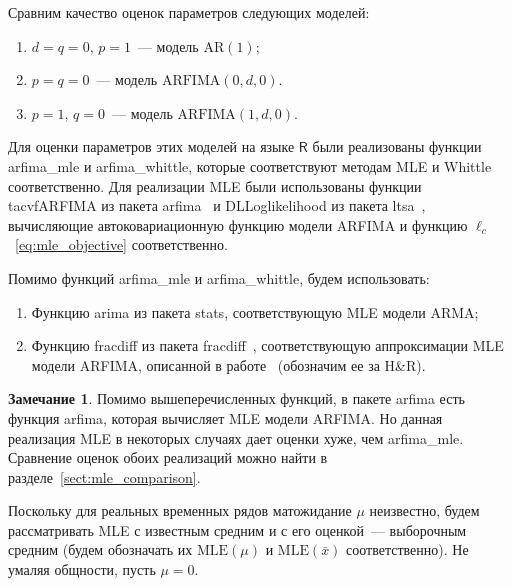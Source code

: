 \documentclass[specialist,
substylefile = spbu_report.rtx,
subf,12pt]{disser}
\theoremstyle{definition}
\newtheorem{remark}{Замечание}[chapter]
\begin{document}
Сравним качество оценок параметров следующих моделей:
\begin{enumerate}
	\item $d=q=0$, $p=1$~--- модель $\textrm{AR}(1)$;
	\item $p=q=0$~--- модель $\textrm{ARFIMA}(0, d, 0)$.
	\item $p=1$, $q=0$~--- модель $\textrm{ARFIMA}(1, d, 0)$.
\end{enumerate}
Для оценки параметров этих моделей на языке $\mathsf{R}$ были реализованы функции \textsf{arfima\_mle} и \textsf{arfima\_whittle}, которые соответствуют методам MLE и Whittle соответственно. Для реализации MLE были использованы функции \textsf{tacvfARFIMA} из пакета \textsf{arfima}~\cite{Veenstra2012} и \textsf{DLLoglikelihood} из пакета \textsf{ltsa}~\cite{McLeod2007}, вычисляющие автоковариационную функцию модели ARFIMA и функцию $\ell_c$~\eqref{eq:mle_objective} соответственно.

Помимо функций \textsf{arfima\_mle} и \textsf{arfima\_whittle}, будем использовать:
\begin{enumerate}
	\item Функцию \textsf{arima} из пакета \textsf{stats}, соответствующую MLE модели ARMA;
	\item Функцию \textsf{fracdiff} из пакета \textsf{fracdiff}~\cite{fracdiff}, соответствующую аппроксимации MLE модели ARFIMA, описанной в работе~\cite{Haslett1989} (обозначим ее за H\&R).
\end{enumerate}
\begin{remark}
	Помимо вышеперечисленных функций, в пакете \textsf{arfima} есть функция \textsf{arfima}, которая вычисляет MLE модели ARFIMA. Но данная реализация MLE в некоторых случаях дает оценки хуже, чем \textsf{arfima\_mle}. Сравнение оценок обоих реализаций можно найти в разделе~\ref{sect:mle_comparison}.
\end{remark}
Поскольку для реальных временных рядов матожидание $\mu$ неизвестно, будем рассматривать MLE с известным средним и с его оценкой~--- выборочным средним (будем обозначать их $\mathrm{MLE}(\mu)$ и $\mathrm{MLE}(\bar x)$ соответственно). Не умаляя общности, пусть $\mu=0$.
\end{document}
